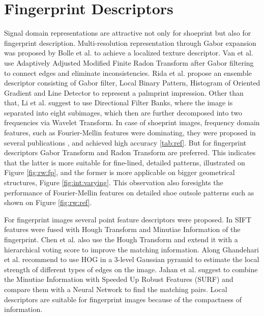 \documentclass[draft,final]{vutinfth} %
\begin{document}
\section*{Fingerprint Descriptors}
\par
Signal domain representations are attractive not only for shoeprint but also for fingerprint description.
Multi-resolution representation through Gabor expansion was proposed by Bolle et al. \cite{bolle2012fingerprint} to achieve a localized texture descriptor.
Van et al. \cite{van2016fingerprint} use Adaptively Adjusted Modified Finite Radon Transform after Gabor filtering to connect edges and eliminate inconsistencies.
Rida et al. \cite{rida2018palmprint} propose an ensemble descriptor consisting of Gabor filter, Local Binary Pattern, Histogram of Oriented Gradient and Line Detector to represent a palmprint impression.
Other than that, Li et al. \cite{li2012texture} suggest to use Directional Filter Banks, where the image is separated into eight subimages, which then are further decomposed into two frequencies via Wavelet Transform.
In case of shoeprint images, frequency domain features, such as Fourier-Mellin features were dominating, they were proposed in several publications  \cite{gueham2007automatic}, \cite{wu2019crime} and achieved high accuracy \ref{tab:ref}.
But for fingerprint descriptors Gabor Transform and Radon Transform are preferred.
This indicates that the latter is more suitable for fine-lined, detailed patterns, illustrated on Figure \ref{fig:rw:fp}, and the former is more applicable on bigger geometrical structures, Figure \ref{fig:int:varying}.
This observation also foresights the performance of Fourier-Mellin features on detailed shoe outsole patterns such as shown on Figure \ref{fig:rw:ref}. 
\par
For fingerprint images several point feature descriptors were proposed.
In \cite{zhou2011adaptive} SIFT \cite{lowe1999object} features were fused with Hough Transform and Minutiae Information of the fingerprint.
Chen et al. \cite{chen2013hierarchical} also use the Hough Transform and extend it with a hierarchical voting score to improve the matching information. 
Along  \cite{rida2018palmprint} Ghandehari et al. \cite{ghandehari2012palmprint} recommend to use HOG in a 3-level Gaussian pyramid to estimate the local strength of different types of edges on the image.
Jahan et al. \cite{jahan2017robust} suggest to combine the Minutiae Information with Speeded Up Robust Features (SURF) and compare them with a Neural Network to find the matching pairs.
Local descriptors are suitable for fingerprint images because of the compactness of information.
\end{document}
